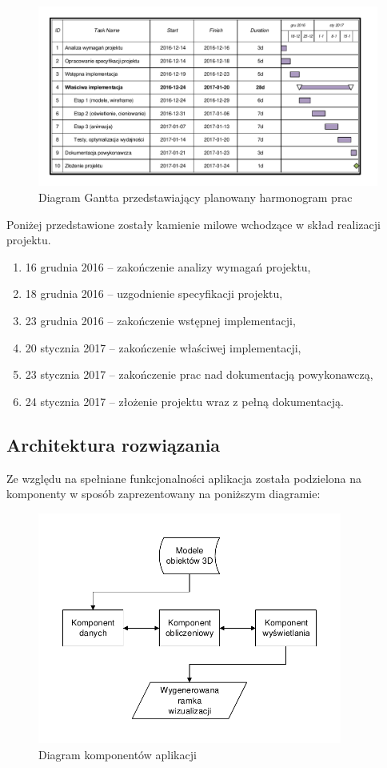 \documentclass[10pt,a4paper]{article}
\begin{document}
\begin{figure}[H]
	\centering
	\includegraphics[width=14cm]{gantt-chart.pdf}
	\caption{Diagram Gantta przedstawiający planowany harmonogram prac}
\end{figure}
Poniżej przedstawione zostały kamienie milowe wchodzące w skład realizacji projektu.
\begin{enumerate}
	\item 16 grudnia 2016 -- zakończenie analizy wymagań projektu,
	\item 18 grudnia 2016 -- uzgodnienie specyfikacji projektu,
	\item 23 grudnia 2016 -- zakończenie wstępnej implementacji,
	\item 20 stycznia 2017 -- zakończenie właściwej implementacji,
	\item 23 stycznia 2017 -- zakończenie prac nad dokumentacją powykonawczą,
	\item 24 stycznia 2017 -- złożenie projektu wraz z pełną dokumentacją.
\end{enumerate}

\newpage

\subsection{Architektura rozwiązania}

Ze względu na spełniane funkcjonalności aplikacja została podzielona na komponenty w sposób zaprezentowany na poniższym diagramie:

\begin{figure}[H]
	\centering
	\includegraphics[width=10cm]{component-chart.pdf}
	\caption{Diagram komponentów aplikacji}
\end{figure}
\end{document}
